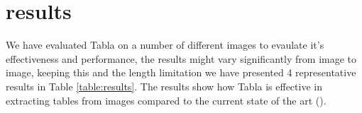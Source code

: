 \documentclass[10pt,journal,compsoc]{IEEEtran}
\begin{document}
\section{results}
We have evaluated Tabla on a number of different images to evaulate it's effectiveness and performance, the results might vary significantly from image to image, keeping this and the length limitation we have presented 4 representative results in Table \ref{table:results}. The results show how Tabla is effective in extracting tables from images compared to the current state of the art ().

\begin{table}[!h]
\caption{Comparison of the current state of the art method () and Tabla over four representative images.}
\label{table:results}
\centering
{}
\end{table}
\end{document}
